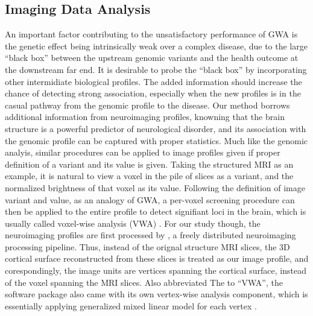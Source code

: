 \subsection{Imaging Data Analysis}
An important factor contributing to the unsatisfactory performance of GWA is the genetic effect being intrinsically weak over a complex disease, due to the large ``black box'' between the upstream genomic variants and the health outcome at the downstream far end. It is desirable to probe the ``black box'' by incorporating other intermidiate biological profiles. The added information should increase the chance of detecting strong association, especially when the new profiles is in the casual pathway from the genomic profile to the disease. Our method borrows additional information from neuroimaging profiles, knowning that the brain structure is a powerful predictor of neurological disorder, and its association with the genomic profile can be captured with proper statistics. Much like the genomic analyis, similar procedures can be applied to image profiles given if proper definition of a variant and its value is given. Taking the structured MRI as an example, it is natural to view a voxel in the pile of slices as a variant, and the normalized brightness of that voxel as its value. Following the definition of image variant and value, as an analogy of GWA, a per-voxel screening procedure can then be applied to the entire profile to detect signifiant loci in the brain, which is usually called voxel-wise analysis (VWA) \cite{VWA1, VWA2, VWA3, VWA4}. For our study though, the neuroimaging profiles are first processed by \FS, a freely distributed neuroimaging processing pipeline. Thus, instead of the orignal structure MRI slices, the 3D cortical surface reconstructed from these slices is treated as our image profile, and corespondingly, the image units are vertices spanning the cortical surface, instead of the voxel spanning the MRI slices. Also abbreviated The to ``VWA'', the software package \FS also came with its own vertex-wise analysis component, which is essentially applying generalized mixed linear model for each vertex \cite{FS:Anl1, FS:Anl2}.

